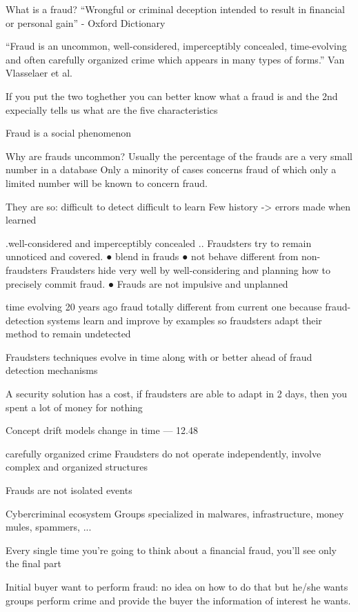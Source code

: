 What is a fraud?
“Wrongful or criminal deception intended to result in
financial or personal gain” - Oxford Dictionary

“Fraud is an uncommon, well-considered, imperceptibly
concealed, time-evolving and often carefully organized
crime which appears in many types of forms.”
Van Vlasselaer et al.

If you put the two toghether you can better know what a fraud is and the 2nd expecially
tells us what are the five characteristics 

Fraud is a social phenomenon

Why are frauds uncommon?
    Usually the percentage of the frauds are a very small number in a database
    Only a minority of cases concerns fraud of which only a limited number will be known to concern fraud.
    
    They are so:
        difficult to detect
        difficult to learn
        Few history -> errors made when learned

.well-considered and imperceptibly
concealed ..
    Fraudsters try to remain unnoticed and covered.
    ● blend in frauds
    ● not behave different from non-fraudsters
    Fraudsters hide very well by well-considering and
    planning how to precisely commit fraud.
    ● Frauds are not impulsive and unplanned

time evolving
    20 years ago fraud totally different from current one
    because fraud-detection systems learn and improve by examples
    so fraudsters adapt their method to remain undetected

    Fraudsters techniques evolve in time along with or better ahead of fraud detection mechanisms

    A security solution has a cost, if fraudsters are able to adapt in 2 days, then you spent a lot of money for nothing

    Concept drift
        models change in time --- 12.48

carefully organized crime
    Fraudsters do not operate independently, involve complex and organized structures

    Frauds are not isolated events

Cybercriminal ecosystem
    Groups specialized in malwares, infrastructure, money mules, spammers, ... 

    Every single time you're going to think about a financial fraud, you'll see only the final part 

    Initial buyer want to perform fraud: no idea on how to do that but he/she wants 
    groups perform crime and provide the buyer the information of interest he wants.

